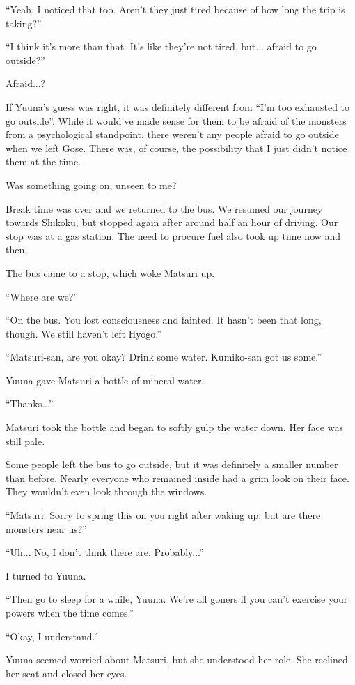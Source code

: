 ``Yeah, I noticed that too. Aren't they just tired because of how long the trip is taking?''

``I think it's more than that. It's like they're not tired, but... afraid to go outside?''

Afraid...?

If Yuuna's guess was right, it was definitely different from ``I'm too exhausted to go outside''. While it would've made sense for them to be afraid of the monsters from a psychological standpoint, there weren't any people afraid to go outside when we left Gose. There was, of course, the possibility that I just didn't notice them at the time.

Was something going on, unseen to me?

Break time was over and we returned to the bus. We resumed our journey towards Shikoku, but stopped again after around half an hour of driving. Our stop was at a gas station. The need to procure fuel also took up time now and then.

The bus came to a stop, which woke Matsuri up.

``Where are we?''

``On the bus. You lost consciousness and fainted. It hasn't been that long, though. We still haven't left Hyogo.''

``Matsuri-san, are you okay? Drink some water. Kumiko-san got us some.''

Yuuna gave Matsuri a bottle of mineral water.

``Thanks...''

Matsuri took the bottle and began to softly gulp the water down. Her face was still pale.

Some people left the bus to go outside, but it was definitely a smaller number than before. Nearly everyone who remained inside had a grim look on their face. They wouldn't even look through the windows.

``Matsuri. Sorry to spring this on you right after waking up, but are there monsters near us?''

``Uh... No, I don't think there are. Probably...''

I turned to Yuuna.

``Then go to sleep for a while, Yuuna. We're all goners if you can't exercise your powers when the time comes.''

``Okay, I understand.''

Yuuna seemed worried about Matsuri, but she understood her role. She reclined her seat and closed her eyes.

